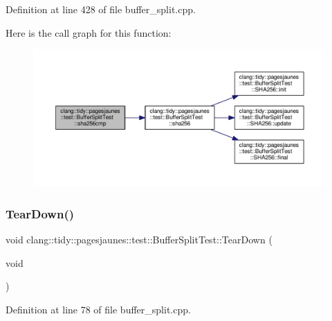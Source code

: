 Definition at line 428 of file buffer\+\_\+split.\+cpp.

Here is the call graph for this function\+:
\nopagebreak
\begin{figure}[H]
\begin{center}
\leavevmode
\includegraphics[width=350pt]{classclang_1_1tidy_1_1pagesjaunes_1_1test_1_1_buffer_split_test_abef0f37ba555b9c4829350bf7b7164c5_cgraph}
\end{center}
\end{figure}
\mbox{\label{classclang_1_1tidy_1_1pagesjaunes_1_1test_1_1_buffer_split_test_aae91b37fcc95236cbe42f939e69b3fc2}} 
\subsubsection{\texorpdfstring{Tear\+Down()}{TearDown()}}
{\footnotesize\ttfamily void clang\+::tidy\+::pagesjaunes\+::test\+::\+Buffer\+Split\+Test\+::\+Tear\+Down (\begin{DoxyParamCaption}\item[{void}]{ }\end{DoxyParamCaption})\hspace{0.3cm}{\ttfamily [virtual]}}



Definition at line 78 of file buffer\+\_\+split.\+cpp.



